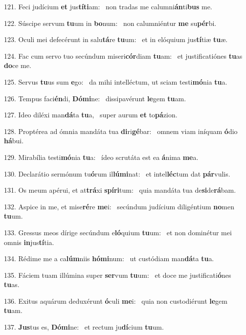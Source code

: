 121. Feci judícium \textbf{et} jus\textbf{tí}\textbf{ti}am: \ast\  non tradas me calumni\textbf{án}ti\textbf{bus} me.\

122. Súscipe servum \textbf{tu}um in \textbf{bo}num: \ast\  non calumniéntur \textbf{me} su\textbf{pér}bi.\

123. Oculi mei defecérunt in salu\textbf{tá}re \textbf{tu}um: \ast\  et in elóquium jus\textbf{tí}tiæ \textbf{tu}æ.\

124. Fac cum servo tuo secúndum miseri\textbf{cór}diam \textbf{tu}am: \ast\  et justificatiónes \textbf{tu}as \textbf{do}ce me.\

125. Servus \textbf{tu}us sum \textbf{e}go: \ast\  da mihi intelléctum, ut sciam testi\textbf{mó}nia \textbf{tu}a.\

126. Tempus faci\textbf{én}di, \textbf{Dó}\textbf{mi}ne: \ast\  dissipavérunt \textbf{le}gem \textbf{tu}am.\

127. Ideo diléxi man\textbf{dá}ta \textbf{tu}a, \ast\  super aurum \textbf{et} to\textbf{pá}zion.\

128. Proptérea ad ómnia mandáta tua \textbf{di}ri\textbf{gé}bar: \ast\  omnem viam iníquam \textbf{ó}dio \textbf{há}bui.\

129. Mirabília testi\textbf{mó}nia \textbf{tu}a: \ast\  ídeo scrutáta est ea \textbf{á}nima \textbf{me}a.\

130. Declarátio sermónum tu\textbf{ó}rum il\textbf{lú}\textbf{mi}nat: \ast\  et intel\textbf{léc}tum dat \textbf{pár}vulis.\

131. Os meum apérui, et at\textbf{trá}xi \textbf{spí}\textbf{ri}tum: \ast\  quia mandáta tua de\textbf{si}de\textbf{rá}bam.\

132. Aspice in me, et mise\textbf{ré}re \textbf{me}i: \ast\  secúndum judícium diligéntium \textbf{no}men \textbf{tu}um.\

133. Gressus meos dírige secúndum e\textbf{ló}quium \textbf{tu}um: \ast\  et non dominétur mei omnis \textbf{in}jus\textbf{tí}tia.\

134. Rédime me a ca\textbf{lúm}niis \textbf{hó}\textbf{mi}num: \ast\  ut custódiam man\textbf{dá}ta \textbf{tu}a.\

135. Fáciem tuam illúmina super \textbf{ser}vum \textbf{tu}um: \ast\  et doce me justificati\textbf{ó}nes \textbf{tu}as.\

136. Exitus aquárum deduxérunt \textbf{ó}culi \textbf{me}i: \ast\  quia non custodiérunt \textbf{le}gem \textbf{tu}am.\

137. \textbf{Jus}tus es, \textbf{Dó}\textbf{mi}ne: \ast\  et rectum ju\textbf{dí}cium \textbf{tu}um.\

